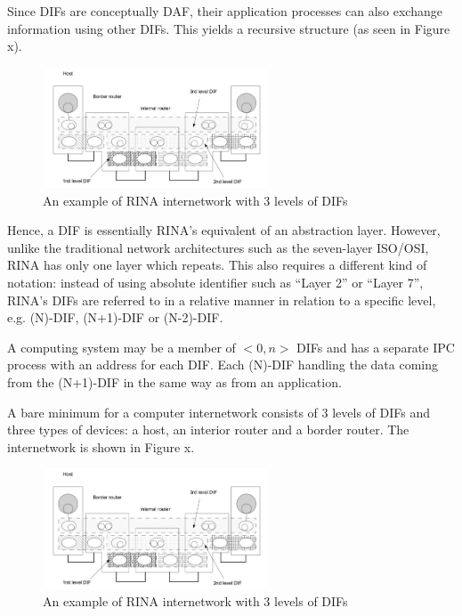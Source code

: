                 Since DIFs are conceptually DAF, their application processes can also exchange information using other DIFs. This yields a recursive structure (as seen in Figure x).

                \begin{figure}[H]
                    \begin{center}
                        \includegraphics[width=0.6\textwidth]{fig/archs_rina-net.png}
                      \caption{An example of RINA internetwork with 3 levels of DIFs}
                      \label{fig:rina_network}
                    \end{center}
                \end{figure}

                Hence, a DIF is essentially RINA's equivalent of an abstraction layer. However, unlike the traditional network architectures such as the seven-layer ISO/OSI, RINA has only one layer which repeats. This also requires a different kind of notation: instead of using absolute identifier such as ``Layer 2'' or ``Layer 7'', RINA's DIFs are referred to in a relative manner in relation to a specific level, e.g. (N)-DIF, (N+1)-DIF or (N-2)-DIF.

                A computing system may be a member of $<0,n>$ DIFs and has a separate IPC process with an address for each DIF. Each (N)-DIF handling the data coming from the (N+1)-DIF in the same way as from an application.

                A bare minimum for a computer internetwork consists of 3 levels of DIFs and three types of devices: a host, an interior router and a border router. The internetwork is shown in Figure x.

                \begin{figure}[H]
                    \begin{center}
                        \includegraphics[width=0.6\textwidth]{fig/archs_rina-net.png}
                      \caption{An example of RINA internetwork with 3 levels of DIFs}
                      \label{fig:rina_network}
                    \end{center}
                \end{figure}

